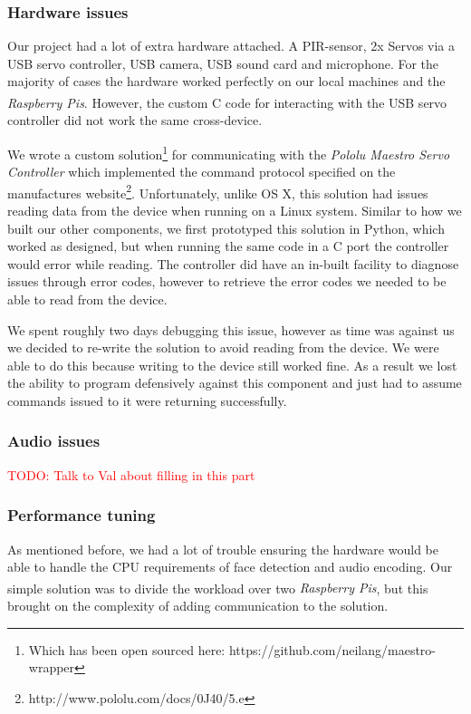 \documentclass[11pt,a4paper,titlepage]{report}
\newcommand{\rpis}{\textit{Raspberry Pi\textsuperscript{\textregistered}s}}
\begin{document}
\subsubsection{Hardware issues}

Our project had a lot of extra hardware attached. A PIR-sensor, 2x Servos via a USB servo controller, USB camera, USB sound card and microphone. For the majority of cases the hardware worked perfectly on our local machines and the \rpis. However, the custom C code for interacting with the USB servo controller did not work the same cross-device.

We wrote a custom solution\footnote{Which has been open sourced here: https://github.com/neilang/maestro-wrapper} for communicating with the \textit{Pololu Maestro Servo Controller} which implemented the command protocol specified on the manufactures website\footnote{http://www.pololu.com/docs/0J40/5.e}. Unfortunately, unlike OS X, this solution had issues reading data from the device when running on a Linux system. Similar to how we built our other components, we first prototyped this solution in Python, which worked as designed, but when running the same code in a C port the controller would error while reading. The controller did have an in-built facility to diagnose issues through error codes, however to retrieve the error codes we needed to be able to read from the device.

We spent roughly two days debugging this issue, however as time was against us we decided to re-write the solution to avoid reading from the device. We were able to do this because writing to the device still worked fine. As a result we lost the ability to program defensively against this component and just had to assume commands issued to it were returning successfully.

\subsubsection{Audio issues}

\textcolor{red}{TODO: Talk to Val about filling in this part}


\subsubsection{Performance tuning}

As mentioned before, we had a lot of trouble ensuring the hardware would be able to handle the CPU requirements of face detection and audio encoding. Our simple solution was to divide the workload over two \rpis, but this brought on the complexity of adding communication to the solution.
\end{document}
